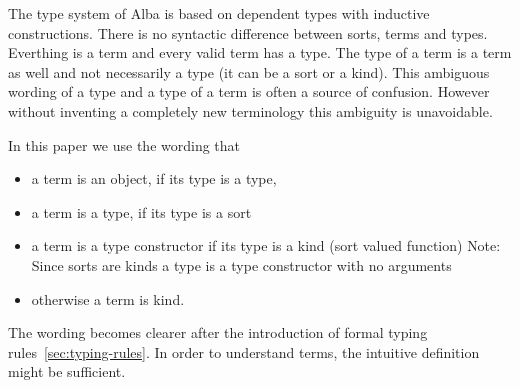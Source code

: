 The type system of Alba is based on dependent types with inductive
constructions. There is no syntactic difference between sorts, terms and
types. Everthing is a term and every valid term has a type. The type of a term
is a term as well and not necessarily a type (it can be a sort or a
kind). This ambiguous wording of a type and a type of a term is often a source
of confusion. However without inventing a completely new terminology this
ambiguity is unavoidable.


In this paper we use the wording that
\begin{itemize}
\item a term is an object, if its type is a type,
\item a term is a type, if its type is a sort
\item a term is a type constructor if its type is a kind (sort valued
  function) {\small Note: Since sorts are kinds a type is a type constructor
    with no arguments}
\item otherwise a term is kind.
\end{itemize}
The wording becomes clearer after the introduction of formal typing
rules~\ref{sec:typing-rules}. In order to understand terms, the intuitive
definition might be sufficient.


